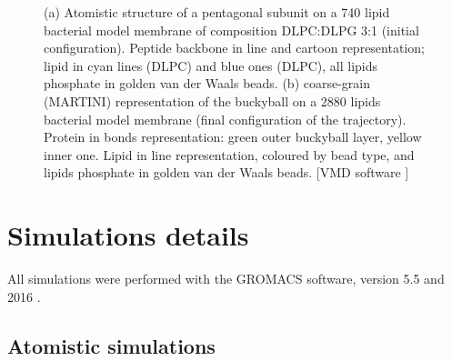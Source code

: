 \begin{figure}[t]
\centering
{}
\caption[Snapshot of simulations of capzip on model membranes]{(a) Atomistic structure of a pentagonal subunit on a 740 lipid bacterial model membrane of composition DLPC:DLPG 3:1 (initial configuration). Peptide backbone in line and cartoon representation; lipid in cyan lines (DLPC) and blue ones (DLPC), all lipids phosphate in golden van der Waals beads. (b) coarse-grain (MARTINI) representation of the buckyball on a 2880 lipids bacterial model membrane (final configuration of the trajectory). Protein in bonds representation: green outer buckyball layer, yellow inner one. Lipid in line representation, coloured by bead type, and lipids phosphate in golden van der Waals beads. [VMD software \citet{HUMP96}]}
\label{fig:pL6_vmd}
\end{figure}


\section{Simulations details} \label{sec:details}

All simulations were performed with the GROMACS software, version 5.5 and 2016 \citep{Berendsen1995,Abraham2015,gromacs_man}. 

\subsection{Atomistic simulations}
